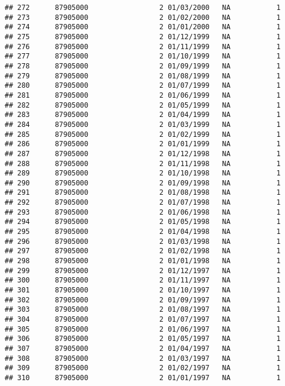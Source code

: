 \documentclass[
]{article}
\begin{document}
\begin{verbatim}
## 272      87905000                 2 01/03/2000   NA           1
## 273      87905000                 2 01/02/2000   NA           1
## 274      87905000                 2 01/01/2000   NA           1
## 275      87905000                 2 01/12/1999   NA           1
## 276      87905000                 2 01/11/1999   NA           1
## 277      87905000                 2 01/10/1999   NA           1
## 278      87905000                 2 01/09/1999   NA           1
## 279      87905000                 2 01/08/1999   NA           1
## 280      87905000                 2 01/07/1999   NA           1
## 281      87905000                 2 01/06/1999   NA           1
## 282      87905000                 2 01/05/1999   NA           1
## 283      87905000                 2 01/04/1999   NA           1
## 284      87905000                 2 01/03/1999   NA           1
## 285      87905000                 2 01/02/1999   NA           1
## 286      87905000                 2 01/01/1999   NA           1
## 287      87905000                 2 01/12/1998   NA           1
## 288      87905000                 2 01/11/1998   NA           1
## 289      87905000                 2 01/10/1998   NA           1
## 290      87905000                 2 01/09/1998   NA           1
## 291      87905000                 2 01/08/1998   NA           1
## 292      87905000                 2 01/07/1998   NA           1
## 293      87905000                 2 01/06/1998   NA           1
## 294      87905000                 2 01/05/1998   NA           1
## 295      87905000                 2 01/04/1998   NA           1
## 296      87905000                 2 01/03/1998   NA           1
## 297      87905000                 2 01/02/1998   NA           1
## 298      87905000                 2 01/01/1998   NA           1
## 299      87905000                 2 01/12/1997   NA           1
## 300      87905000                 2 01/11/1997   NA           1
## 301      87905000                 2 01/10/1997   NA           1
## 302      87905000                 2 01/09/1997   NA           1
## 303      87905000                 2 01/08/1997   NA           1
## 304      87905000                 2 01/07/1997   NA           1
## 305      87905000                 2 01/06/1997   NA           1
## 306      87905000                 2 01/05/1997   NA           1
## 307      87905000                 2 01/04/1997   NA           1
## 308      87905000                 2 01/03/1997   NA           1
## 309      87905000                 2 01/02/1997   NA           1
## 310      87905000                 2 01/01/1997   NA           1

\end{verbatim}
\end{document}
